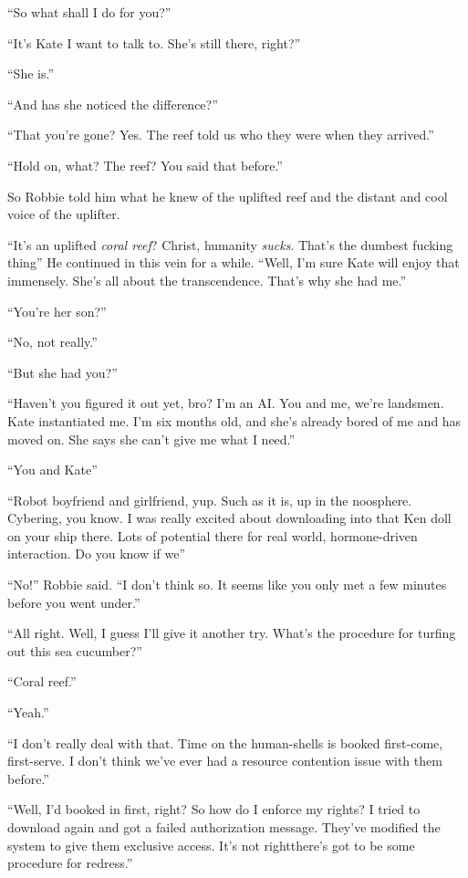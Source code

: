 “So what shall I do for you?”

“It’s Kate I want to talk to. She’s still there, right?”

“She is.”

“And has she noticed the difference?”

“That you’re gone? Yes. The reef told us who they were when they
arrived.”

“Hold on, what? The reef? You said that before.”

So Robbie told him what he knew of the uplifted reef and the
distant and cool voice of the uplifter.

“It’s an uplifted \emph{coral reef}? Christ, humanity \emph{sucks}.
That’s the dumbest fucking thing\dash{}” He continued in this vein for a
while. “Well, I’m sure Kate will enjoy that immensely. She’s all
about the transcendence. That’s why she had me.”

“You’re her son?”

“No, not really.”

“But she had you?”

“Haven’t you figured it out yet, bro? I’m an AI. You and me, we’re
landsmen. Kate instantiated me. I’m six months old, and she’s
already bored of me and has moved on. She says she can’t give me
what I need.”

“You and Kate\dash{}”

“Robot boyfriend and girlfriend, yup. Such as it is, up in the
noosphere. Cybering, you know. I was really excited about
downloading into that Ken doll on your ship there. Lots of
potential there for real world, hormone-driven interaction. Do you
know if we\dash{}”

“No!” Robbie said. “I don’t think so. It seems like you only met a
few minutes before you went under.”

“All right. Well, I guess I’ll give it another try. What’s the
procedure for turfing out this sea cucumber?”

“Coral reef.”

“Yeah.”

“I don’t really deal with that. Time on the human-shells is booked
first-come, first-serve. I don’t think we’ve ever had a resource
contention issue with them before.”

“Well, I’d booked in first, right? So how do I enforce my rights? I
tried to download again and got a failed authorization message.
They’ve modified the system to give them exclusive access. It’s not
right\dash{}there’s got to be some procedure for redress.”

